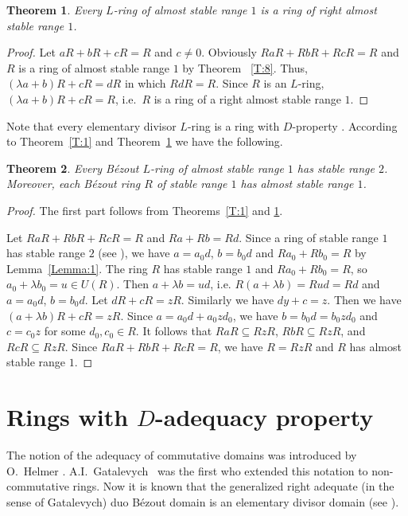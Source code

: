 \documentclass[10pt,a4paper]{amsart}
\theoremstyle{plain}
\newtheorem{theorem}{Theorem}
\theoremstyle{definition}
\begin{document}
\begin{theorem}\label{T:9}
Every  $L$-ring of almost stable range $1$ is a ring of  right almost stable range $1$.
\end{theorem}

\begin{proof}
Let $aR+bR+cR=R$ and $c\ne 0$. Obviously $RaR+RbR+RcR=R$ and  $R$ is a ring of  almost stable range $1$ by Theorem ~\ref{T:8}.
Thus, $(\lambda a +b)R+cR=dR$ in which  $RdR=R$. Since $R$ is an  $L$-ring,  $(\lambda a +b)R+cR=R$, i.e.~$R$ is a ring of a right almost stable range $1$.
\end{proof}


Note that every  elementary divisor $L$-ring  is a ring with $D$-property  \cite[Theorem~4.7.1]{12-zabavsky}.
According to Theorem~\ref{T:1} and Theorem~\ref{T:9}  we have the following.

\begin{theorem}\label{T:10}
Every  B\'ezout $L$-ring  of almost stable range $1$ has  stable range $2$.
Moreover, each B\'ezout ring $R$ of stable range $1$ has  almost  stable range $1$.
\end{theorem}

\begin{proof}
The first part follows from  Theorems~\ref{T:1} and \ref{T:9}.

Let $RaR+RbR+RcR=R$ and $Ra+Rb=Rd$. Since a  ring of stable range $1$ has  stable range $2$ (see \cite[p.\,14]{1-bass}),
we have   $a=a_0d$,  $b=b_0d$ and $Ra_0+Rb_0=R$ by Lemma~\ref{Lemma:1}. The ring  $R$ has  stable range $1$ and $Ra_0+Rb_0=R$, so  $a_0+\lambda b_0=u\in U(R)$. Then $a+\lambda b=ud$, i.e. $R(a+\lambda b)=Rud=Rd$ and $a=a_0d$,  $b=b_0d$. Let $dR+cR=zR$. Similarly we have $dy+c=z$. Then we have $(a+\lambda b)R+cR=zR$. Since $a=a_0d+a_0zd_0$,  we have $b=b_0d=b_0zd_0$ and  $c=c_0z$ for some $d_0,c_0\in R$. It follows that  $RaR\subseteq RzR$,
$RbR\subseteq RzR$, and $RcR\subseteq RzR$. Since $RaR+RbR+RcR=R$, we have   $R=RzR$ and  $R$ has  almost stable range $1$.
\end{proof}





\section{Rings with $D$-adequacy property}



The notion of the adequacy of commutative domains was  introduced by  O.~Helmer \cite{Helmer}.
A.I.~Gatalevych~\cite[Definition 1, p.\,116]{Gatalevich} was the first who extended this notation  to non-\-com\-mu\-ta\-tive  rings.
Now it is known that  the generalized right adequate (in the sense of Gatalevych)  duo B\'ezout domain is an elementary divisor  domain  (see  \cite[Theorem 2, p.\,117]{Gatalevich}).
\end{document}
